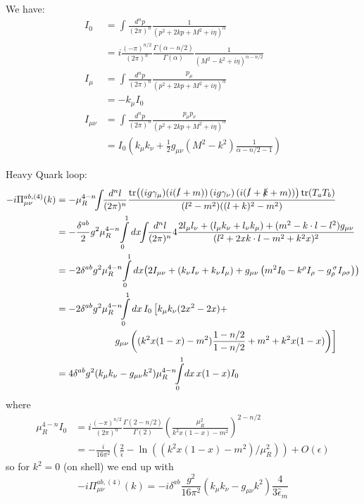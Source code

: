We have\cite[(A.18)-(A.20)]{Pokorski}:
\begin{align}
I_0 &= \int\!\frac{d^np}{(2\pi)^n} \frac 1 {(p^2+2kp+M^2+i\eta)^\alpha}\\
 &= i\frac{(-\pi)^{n/2}}{(2\pi)^n} \frac{\Gamma(\alpha-n/2)}{\Gamma(\alpha)} \frac 1 {(M^2-k^2+i\eta)^{\alpha-n/2}}\\
I_\mu &= \int\!\frac{d^np}{(2\pi)^n} \frac {p_\mu} {(p^2+2kp+M^2+i\eta)^\alpha}\\
 &= - k_\mu I_0\\
I_{\mu\nu}&= \int\!\frac{d^np}{(2\pi)^n} \frac {p_\mu p_\nu} {(p^2+2kp+M^2+i\eta)^\alpha}\\
 &= I_0\left(k_\mu k_\nu + \frac 1 2 g_{\mu\nu}(M^2-k^2)\frac 1 {\alpha-n/2-1}\right)
\end{align}

Heavy Quark loop:
\begin{align}
-i\Pi_{\mu\nu}^{ab,(4)}(k) &=  -\mu_R^{4-n}\!\!\int\!\!\frac{d^nl}{(2\pi)^n} \frac{\tr\!\left((ig\gamma_\mu)(i(\slashed l + m))\left(ig\gamma_\nu\right)(i(\slashed l + \slashed k + m))\right)\tr(T_aT_b)}{(l^2-m^2)((l+k)^2-m^2)}\\
 &= -\frac {\delta^{ab}}{2}g^2\mu_R^{4-n}\!\int\limits_0^1dx\!\!\int\!\!\frac{d^nl}{(2\pi)^n} 4\frac{2l_\mu l_\nu+(l_\mu k_\nu+l_\nu k_\mu)+(m^2-k\cdot l-l^2)g_{\mu\nu}}{(l^2+2xk\cdot l-m^2+k^2 x)^2}\\
 &= -2\delta^{ab}g^2\mu_R^{4-n}\!\int\limits_0^1dx\!\left(2I_{\mu\nu}+\left(k_\nu I_\nu + k_\nu I_\mu\right) + g_{\mu\nu}\left(m^2I_0-k^\rho I_\rho - g_\rho^{\,\sigma}I_{\rho\sigma}\right)\right)\\
 &= -2\delta^{ab}g^2\mu_R^{4-n}\!\!\int\limits_0^1dx\,I_0\left[k_\mu k_\nu(2x^2-2x)+\right.\nonumber\\
 &\hspace{60pt}\left.g_{\mu\nu}\left((k^2x(1-x)-m^2)\frac{1-n/2}{1-n/2}+m^2+k^2x(1-x)\right)\right]\\
 &= 4\delta^{ab}g^2(k_\mu k_\nu - g_{\mu\nu}k^2) \mu_R^{4-n}\!\!\int\limits_0^1\!dx\,x(1-x)I_0
\end{align}
where
\begin{align}
\mu_R^{4-n}I_0 &= i\frac{(-\pi)^{n/2}}{(2\pi)^n} \frac{\Gamma(2-n/2)}{\Gamma(2)} \left(\frac {\mu_R^2} {k^2x(1-x)-m^2}\right)^{2-n/2}\\
 &= -\frac i {16\pi^2}\left(\frac 2 {\hat\epsilon}-\ln((k^2x(1-x)-m^2)/\mu_R^2)\right) + O(\epsilon)
\end{align}
so for $k^2=0$ (on shell) we end up with
\begin{equation}
-i\Pi_{\mu\nu}^{ab,(4)}(k) = -i\delta^{ab}\frac{g^2}{16\pi^2}(k_\mu k_\nu - g_{\mu\nu}k^2) \frac 4 {3\hat\epsilon_m}
\end{equation}


